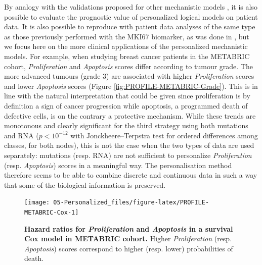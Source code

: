 \documentclass[a4paper,12pt,twoside,onecolumn,openright,final,oldfontcommands]{memoir}
\begin{document}
By analogy with the validations proposed for other mechanistic models
\citep{fey2015signaling}, it is also possible to evaluate the prognostic
value of personalized logical models on patient data. It is also
possible to reproduce with patient data analyses of the same type as
those previously performed with the MKI67 biomarker, as was done in
\citet{beal2019personalization}, but we focus here on the more clinical
applications of the personalized mechanistic models. For example, when
studying breast cancer patients in the METABRIC cohort,
\emph{Proliferation} and \emph{Apoptosis} scores differ according to
tumour grade. The more advanced tumours (grade 3) are associated with
higher \emph{Proliferation} scores and lower \emph{Apoptosis} scores
(Figure \ref{fig:PROFILE-METABRIC-Grade}). This is in line with the
natural interpretation that could be given since proliferation is by
definition a sign of cancer progression while apoptosis, a programmed
death of defective cells, is on the contrary a protective mechanism.
While these trends are monotonous and clearly significant for the third
strategy using both mutations and RNA (\(p<10^{-12}\) with
Jonckheere--Terpstra test for ordered differences among classes, for
both nodes), this is not the case when the two types of data are used
separately: mutations (resp. RNA) are not sufficient to personalize
\emph{Proliferation} (resp. \emph{Apoptosis}) scores in a meaningful
way. The personalisation method therefore seems to be able to combine
discrete and continuous data in such a way that some of the biological
information is preserved.

\begin{figure}

{\centering \texttt{[image: 05-Personalized\_files/figure-latex/PROFILE-METABRIC-Cox-1]} 

}

\caption[Hazard ratios for *Proliferation* and *Apoptosis* in a survival Cox model in METABRIC cohort]{\textbf{Hazard ratios for
\emph{Proliferation} and \emph{Apoptosis} in a survival Cox model in
METABRIC cohort.} Higher \emph{Proliferation} (resp. \emph{Apoptosis})
scores correspond to higher (resp. lower) probabilities of death.}\label{fig:PROFILE-METABRIC-Cox}
\end{figure}
\end{document}
